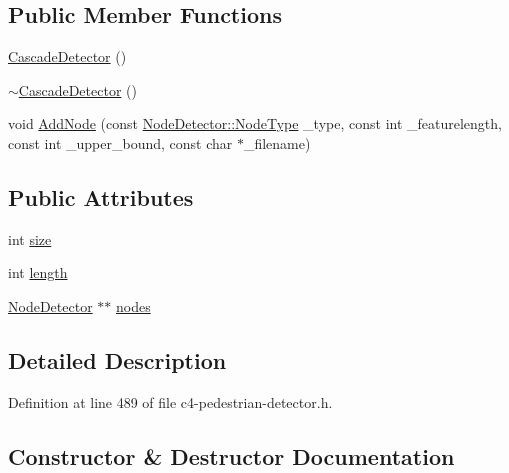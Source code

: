 \subsection*{Public Member Functions}
\begin{DoxyCompactItemize}
\item 
\mbox{\hyperlink{class_cascade_detector_a687a7c3ed39991cd3209d65283c0149b}{Cascade\+Detector}} ()
\item 
\mbox{\hyperlink{class_cascade_detector_acd01c8d06da3ea93446d71f3d35f4e1e}{$\sim$\+Cascade\+Detector}} ()
\item 
void \mbox{\hyperlink{class_cascade_detector_aa8759d8bdb90d648046aa72f0cf0fab3}{Add\+Node}} (const \mbox{\hyperlink{class_node_detector_a7188c48dfe6b88b3b7f47c599c4832bd}{Node\+Detector\+::\+Node\+Type}} \+\_\+type, const int \+\_\+featurelength, const int \+\_\+upper\+\_\+bound, const char $\ast$\+\_\+filename)
\end{DoxyCompactItemize}
\subsection*{Public Attributes}
\begin{DoxyCompactItemize}
\item 
int \mbox{\hyperlink{class_cascade_detector_a4a1280062076bdea7b404e9fca3a53a4}{size}}
\item 
int \mbox{\hyperlink{class_cascade_detector_a2ce4d234703b3332cf7e17624b3b30a5}{length}}
\item 
\mbox{\hyperlink{class_node_detector}{Node\+Detector}} $\ast$$\ast$ \mbox{\hyperlink{class_cascade_detector_a7977422f255cf4d753665c0c6a0b0f07}{nodes}}
\end{DoxyCompactItemize}


\subsection{Detailed Description}


Definition at line 489 of file c4-\/pedestrian-\/detector.\+h.



\subsection{Constructor \& Destructor Documentation}
\mbox{\label{class_cascade_detector_a687a7c3ed39991cd3209d65283c0149b}} 
